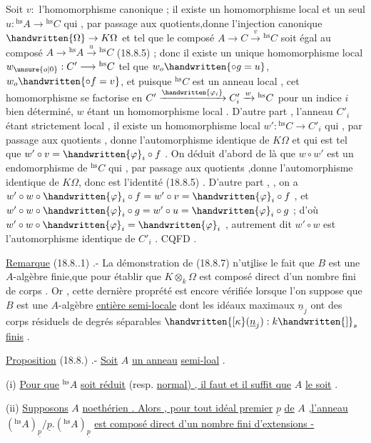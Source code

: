 Soit $v:$   l'homomorphisme canonique ; il existe  un homomorphisme
local et un seul $u:{}^{\mathrm{hs}}A\to{}^{\mathrm{hs}}C$ qui , par passage aux quotients,donne l'injection
canonique $\handwritten{\Omega}\to K\Omega$  et tel que le composé $A\longrightarrow C\xrightarrow{v}{}^{\mathrm{hs}}C$
soit égal au composé $A\longrightarrow{}^{\mathrm{hs}}A\xrightarrow{u}{}^{\mathrm{hs}}C$ (18.8.5) ; donc il existe un unique
homomorphisme local $w_{\unsure{o|0}}:C'\longrightarrow{}^{\mathrm{hs}}C$ tel que $w_o\handwritten{\circ g=u}$, $w_o\handwritten{\circ f=v}$, et puisque $ {}^{\mathrm{hs}}C$
est un anneau local , cet homomorphisme se factorise en $C'\xrightarrow{\handwritten{\varphi_i}}C'_i\xrightarrow{w}{}^{\mathrm{hs}}C$
pour un indice $i$ bien déterminé, $w$ étant un homomorphisme local . D'autre
part , l'anneau $C'_i$ étant strictement local , il existe un homomorphisme local
$w':{}^{\mathrm{hs}}C\to C'_i$ qui , par passage aux quotients , donne l'automorphisme
identique de $K\Omega$ et qui est tel que $w'\circ v=\handwritten{\varphi}_i\circ f$  . On déduit d'abord de là
que $w\circ w'$ est un endomorphisme de $ {}^{\mathrm{hs}}C$ qui , par passage aux quotients ,donne
l'automorphisme identique de $K\Omega$, donc est l'identité (18.8.5) . D'autre
part , , on a $w'\circ w\circ\handwritten{\varphi}_i\circ f=w'\circ v=\handwritten{\varphi}_i\circ f$ , et $w'\circ w\circ\handwritten{\varphi}_i\circ g=w'\circ u=\handwritten{\varphi}_i\circ g$ ; d'où $w'\circ w\circ\handwritten{\varphi}_i=
\handwritten{\varphi}_i$ , autrement dit $w'\circ w$ est l'automorphisme identique de $C'_i$ . CQFD .

\uline{Remarque} (18.8.{}.1) .- La démonstration de (18.8.7)
\handwritten{\unsure{!}} n'ut\uline{i}lise le
fait que $B$ est une $A$-algèbre finie,que pour établir que $K\otimes_k\Omega$ est
composé direct d'un nombre fini de corps . Or , cette dernière proprété
est encore vérifiée lorsque l'on suppose que $B$ est une $A$-algèbre
\uline{entière semi-locale} dont les idéaux maximaux $\underline{n}_j$ ont des corps résiduels
de degrés séparables $\handwritten{[\kappa}(\underline{n}_j):k\handwritten{]}_s$ \uline{finis} .

\uline{Proposition} (18.8.) .- \uline{Soit} $A$ \uline{un anneau}  \uline{semi-loal} .

(i) \uline{Pour que} $ {}^{\mathrm{hs}}A$ \uline{soit réduit} (resp. \uline{normal) , il faut et il suffit que} $A$ \uline{le soit} .

(ii) \uline{Supposons} $A$ \uline{noethérien . Alors , pour tout idéal premier} $\underline{p}$ \uline{de} $A$ ,\uline{l'anneau} $({}^{\mathrm{hs}}A)_{\underline{p}}/\underline{p}.({}^{\mathrm{hs}}A)_{\underline{p}}$ \uline{est composé direct d'un nombre fini d'extensions -}
